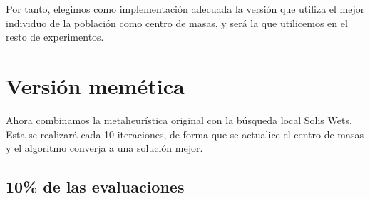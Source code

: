 Por tanto, elegimos como implementación adecuada la versión que utiliza el mejor individuo de la población como centro de masas, y será la que utilicemos en el resto de experimentos.



\newpage
\section{Versión memética}
Ahora combinamos la metaheurística original con la búsqueda local Solis Wets. Esta se realizará cada 10 iteraciones, de forma que se actualice el centro de masas y el algoritmo converja a una solución mejor.

\subsection*{10\% de las evaluaciones}

